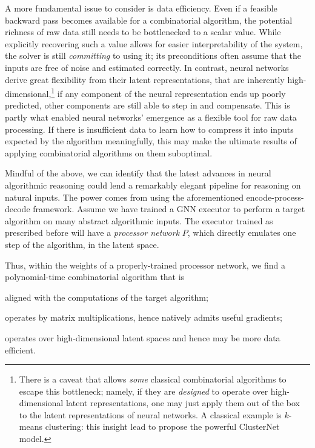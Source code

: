 \documentclass[twoside,11pt]{article}
\begin{document}
A more fundamental issue to consider is {data efficiency}. Even if a feasible backward pass becomes available for a combinatorial algorithm, the potential richness of raw data still needs to be bottlenecked to a scalar value. While explicitly recovering such a value allows for easier interpretability of the system, the solver is still \emph{committing} to using it; its preconditions often assume that the inputs are free of noise and estimated correctly. In contrast, neural networks derive great flexibility from their {latent representations}, that are inherently {high-dimensional},\footnote{There is a caveat that allows \emph{some} classical combinatorial algorithms to escape this bottleneck; namely, if they are \emph{designed} to operate over high-dimensional latent representations, one may just apply them out of the box to the latent representations of neural networks. A classical example is $k$-means clustering:  this insight lead \citet{wilder2019end} to propose the powerful ClusterNet model.} if any component of the neural representation ends up poorly predicted, other components are still able to step in and compensate. This is partly what enabled neural networks' emergence as a flexible tool for raw data processing. If there is insufficient data to learn how to compress it into inputs expected by the algorithm meaningfully, this may make the ultimate results of applying combinatorial algorithms on them suboptimal.

Mindful of the above, we can identify that the latest advances in neural algorithmic reasoning could lend a remarkably elegant pipeline for reasoning on natural inputs. The power comes from using the aforementioned encode-process-decode framework. Assume we have trained a GNN executor to perform a target algorithm on many abstract algorithmic inputs. The executor trained as prescribed before will have a \emph{processor network} $P$, which directly emulates one step of the algorithm, {in the latent space}.

Thus, within the weights of a properly-trained processor network, we find a polynomial-time combinatorial algorithm that is
\begin{inparaenum}
	\item[(a)] aligned with the computations of the target algorithm;
	\item[(b)] operates by matrix multiplications, hence natively admits useful gradients;
	\item[(c)] operates over high-dimensional latent spaces and hence may be more data efficient.
\end{inparaenum}
\end{document}
